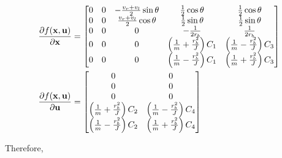 \begin{align*}
  \frac{\partial f(\mathbf{x}, \mathbf{u})}{\partial\mathbf{x}} &=
  \begin{bmatrix}
    0 & 0 & -\frac{v_r + v_l}{2}\sin\theta & \frac{1}{2}\cos\theta &
      \frac{1}{2}\cos\theta \\
    0 & 0 & \frac{v_r + v_l}{2}\cos\theta & \frac{1}{2}\sin\theta &
      \frac{1}{2}\sin\theta \\
    0 & 0 & 0 & -\frac{1}{2r_b} & \frac{1}{2r_b} \\
    0 & 0 & 0 & \left(\frac{1}{m} + \frac{r_b^2}{J}\right) C_1 &
      \left(\frac{1}{m} - \frac{r_b^2}{J}\right) C_3 \\
    0 & 0 & 0 & \left(\frac{1}{m} - \frac{r_b^2}{J}\right) C_1 &
      \left(\frac{1}{m} + \frac{r_b^2}{J}\right) C_3
  \end{bmatrix} \\
  \frac{\partial f(\mathbf{x}, \mathbf{u})}{\partial\mathbf{u}} &=
  \begin{bmatrix}
    0 & 0 \\
    0 & 0 \\
    0 & 0 \\
    \left(\frac{1}{m} + \frac{r_b^2}{J}\right) C_2 &
    \left(\frac{1}{m} - \frac{r_b^2}{J}\right) C_4 \\
    \left(\frac{1}{m} - \frac{r_b^2}{J}\right) C_2 &
    \left(\frac{1}{m} + \frac{r_b^2}{J}\right) C_4
  \end{bmatrix}
\end{align*}

Therefore,

